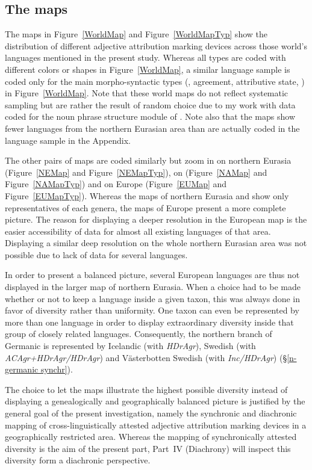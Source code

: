 \subsection{The maps}
The maps in Figure~\ref{WorldMap} and Figure~\ref{WorldMapTyp} show the distribution of different adjective attribution marking devices across those world's languages mentioned in the present study. Whereas all types are coded with different colors or shapes in Figure~\ref{WorldMap}, a similar language sample is coded only for the main morpho-syntactic types (, agreement, attributive state, ) in Figure~\ref{WorldMap}. Note that these world maps do not reflect systematic sampling but are rather the result of random choice due to my work with data coded for the noun phrase structure module of  \citep{AUTOTYP-NP}. Note also that the maps show fewer languages from the northern Eurasian area than are actually coded in the language sample in the Appendix.

The other pairs of maps are coded similarly but zoom in on northern Eurasia (Figure~\ref{NEMap} and Figure~\ref{NEMapTyp}), on  (Figure~\ref{NAMap} and Figure~\ref{NAMapTyp}) and on Europe (Figure~\ref{EUMap} and Figure~\ref{EUMapTyp}). Whereas the maps of northern Eurasia and  show only representatives of each genera, the maps of Europe present a more complete picture. The reason for displaying a deeper resolution in the European map is the easier accessibility of data for almost all existing languages of that area. Displaying a similar deep resolution on the whole northern Eurasian area was not possible due to lack of data for several languages.

In order to present a balanced picture, several European languages are thus not displayed in the larger map of northern Eurasia. When a choice had to be made whether or not to keep a language inside a given taxon, this was always done in favor of diversity rather than uniformity. One taxon can even be represented by more than one language in order to display extraordinary diversity inside that group of closely related languages. Consequently, the northern branch of Germanic is represented by Icelandic (with \textit{HDrAgr}), Swedish (with \textit{ACAgr+HDrAgr/HDrAgr}) and Västerbotten Swedish (with \textit{Inc/HDrAgr}) (\S\ref{n-germanic synchr}).

The choice to let the maps illustrate the highest possible diversity instead of displaying a genealogically and geographically balanced picture is justified by the general goal of the present investigation, namely the synchronic and diachronic mapping of cross-linguistically attested adjective attribution marking devices in a geographically restricted area. Whereas the mapping of synchronically attested diversity is the aim of the present part, Part~IV (Diachrony) will inspect this diversity form a diachronic perspective.
